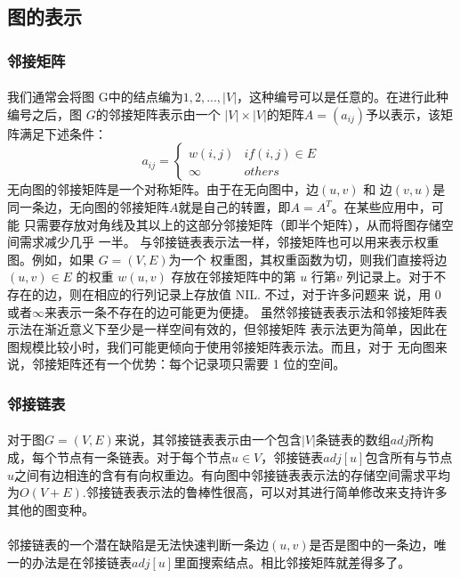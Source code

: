 \documentclass[UTF8,a4paper]{ctexart}
\begin{document}
\subsection{图的表示}
\subsubsection{邻接矩阵}
\paragraph{}我们通常会将图 G中的结点编为$1,2,...,|V|$，这种编号可以是任意的。在进行此种编号之后，图 $G$的邻接矩阵表示由一个 $|V|\times|V|$的矩阵$A=(a_{ij})$予以表示，该矩阵满足下述条件：
\[
    a_{ij}=\begin{cases}
        w(i,j) & if(i,j)\in E \\
        \infty & others
    \end{cases}
\]
无向图的邻接矩阵是一个对称矩阵。由于在无向图中，边$(u,v)$ 和
边$(v, u)$是同一条边，无向图的邻接矩阵$A$就是自己的转置，即$ A=A^T$。在某些应用中，可能 只需要存放对角线及其以上的这部分邻接矩阵（即半个矩阵），从而将图存储空间需求减少几乎 一半。
与邻接链表表示法一样，邻接矩阵也可以用来表示权重图。例如，如果 $G = (V,E)$为一个 权重图，其权重函数为切，则我们直接将边$(u, v)\in E$ 的权重 $w(u,v)$ 存放在邻接矩阵中的第 $u$ 行第$v$ 列记录上。对于不存在的边，则在相应的行列记录上存放值 NIL. 不过，对于许多问题来 说，用 0 或者$\infty$来表示一条不存在的边可能更为便捷。
虽然邻接链表表示法和邻接矩阵表示法在渐近意义下至少是一样空间有效的，但邻接矩阵 表示法更为简单，因此在图规模比较小时，我们可能更倾向于使用邻接矩阵表示法。而且，对于 无向图来说，邻接矩阵还有一个优势：每个记录项只需要 1 位的空间。
\subsubsection{邻接链表}
\paragraph{}对于图$G=(V,E)$来说，其邻接链表表示由一个包含$|V|$条链表的数组$adj$所构成，每个节点有一条链表。对于每个节点$u\in V$，邻接链表$adj[u]$包含所有与节点$u$之间有边相连的含有有向权重边。有向图中邻接链表表示法的存储空间需求平均为$O(V+E)$.邻接链表表示法的鲁棒性很高，可以对其进行简单修改来支持许多其他的图变种。
\paragraph{}邻接链表的一个潜在缺陷是无法快速判断一条边$(u, v)$是否是图中的一条边，唯一的办法是在邻接链表$adj[u]$里面搜索结点。相比邻接矩阵就差得多了。
\end{document}
